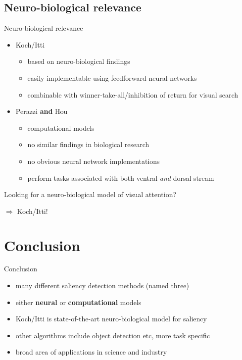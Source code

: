 \documentclass[compress,t]{beamer}
\begin{document}
\subsection{Neuro-biological relevance}
\begin{frame}{Neuro-biological relevance}
    \begin{itemize}
        \item Koch/Itti 
        \begin{itemize}
            \item based on neuro-biological findings
            \item easily implementable using feedforward neural networks
            \item combinable with winner-take-all/inhibition of return for visual search
        \end{itemize}    
        \pause
        \item Perazzi \textbf{and} Hou
        \begin{itemize}
            \item computational models
            \item no similar findings in biological research
            \item no obvious neural network implementations
            \item perform tasks associated with both ventral \emph{and} dorsal stream
        \end{itemize}    
    \end{itemize}    

    \pause

    Looking for a neuro-biological model of visual attention? 

    \pause $\Rightarrow$ Koch/Itti!
\end{frame}

\section{Conclusion}
\begin{frame}{Conclusion}
    \begin{itemize}[<+->]
        \item many different saliency detection methods (named three)
        \item either \textbf{neural} or \textbf{computational} models
        \item Koch/Itti is state-of-the-art neuro-biological model for saliency
        \item other algorithms include object detection etc, more task specific
        \item broad area of applications in science and industry
    \end{itemize}
\end{frame}
\end{document}
